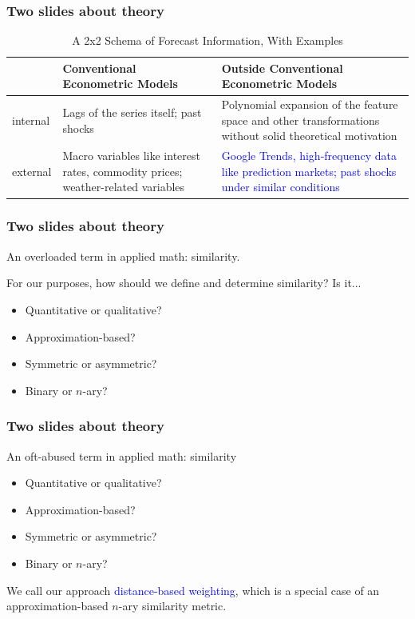 \documentclass[9pt]{beamer}
\theoremstyle{definition}
\begin{document}
\begin{frame}\frametitle{Two slides about theory}
   
    \begin{table}[htb]
        \centering %
        \caption{A 2x2 Schema of Forecast Information, With Examples}
        \begin{tabular}{ | p{1cm} | p{4.8cm}| p{4.8cm} | } 
          \hline
          & Conventional Econometric Models & Outside Conventional Econometric Models\\ 
          \hline
          internal & Lags of the series itself; past shocks & Polynomial expansion of the feature space and other transformations without solid theoretical motivation \\
          \hline
          external & Macro variables like interest rates, commodity prices; weather-related variables & \textcolor{blue}{Google Trends, high-frequency data like prediction markets; past shocks under similar conditions} \\ 
          \hline
        \end{tabular}
      \end{table}
\end{frame}

\begin{frame}\frametitle{Two slides about theory}
   
    An overloaded term in applied math: similarity.

    For our purposes, how should we define and determine similarity?  Is it...
    \begin{itemize}
    \item Quantitative or qualitative?
    \item Approximation-based?
    \item Symmetric or asymmetric?
    \item Binary or $n$-ary?
    \end{itemize}

\end{frame}

\begin{frame}\frametitle{Two slides about theory}
   
    An oft-abused term in applied math: similarity
    \begin{itemize}
    \item Quantitative or qualitative?
    \item Approximation-based?
    \item Symmetric or asymmetric?
    \item Binary or $n$-ary?
    \end{itemize}

    We call our approach \textcolor{blue}{distance-based weighting}, which is a special case of an approximation-based $n$-ary similarity metric.
\end{frame}
\end{document}
